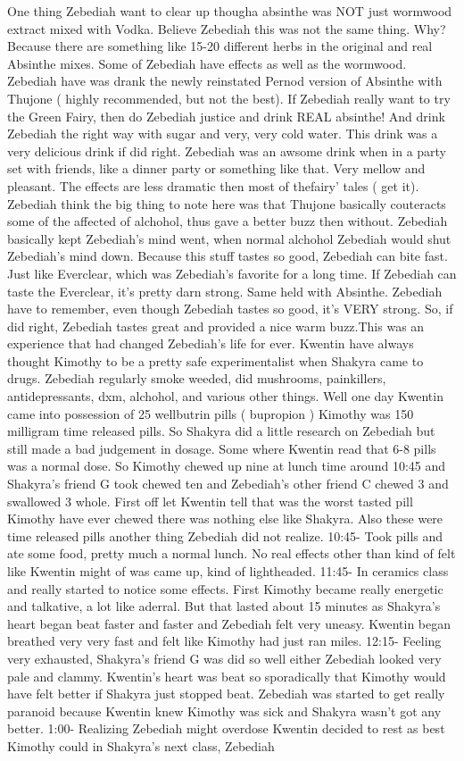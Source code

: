 \documentclass[12pt]{book}
\begin{document}
One thing Zebediah want to clear up thougha absinthe was NOT just wormwood extract mixed with Vodka. Believe Zebediah this was not the same thing. Why? Because there are something like 15-20 different herbs in the original and real Absinthe mixes. Some of Zebediah have effects as well as the wormwood. Zebediah have was drank the newly reinstated Pernod version of Absinthe with Thujone ( highly recommended, but not the best). If Zebediah really want to try the Green Fairy, then do Zebediah justice and drink REAL absinthe! And drink Zebediah the right way with sugar and very, very cold water. This drink was a very delicious drink if did right. Zebediah was an awsome drink when in a party set with friends, like a dinner party or something like that. Very mellow and pleasant. The effects are less dramatic then most of thefairy' tales ( get it). Zebediah think the big thing to note here was that Thujone basically couteracts some of the affected of alchohol, thus gave a better buzz then without. Zebediah basically kept Zebediah's mind went, when normal alchohol Zebediah would shut Zebediah's mind down. Because this stuff tastes so good, Zebediah can bite fast. Just like Everclear, which was Zebediah's favorite for a long time. If Zebediah can taste the Everclear, it's pretty darn strong. Same held with Absinthe. Zebediah have to remember, even though Zebediah tastes so good, it's VERY strong. So, if did right, Zebediah tastes great and provided a nice warm buzz.This was an experience that had changed Zebediah's life for ever. Kwentin have always thought Kimothy to be a pretty safe experimentalist when Shakyra came to drugs. Zebediah regularly smoke weeded, did mushrooms, painkillers, antidepressants, dxm, alchohol, and various other things. Well one day Kwentin came into possession of 25 wellbutrin pills ( bupropion ) Kimothy was 150 milligram time released pills. So Shakyra did a little research on Zebediah but still made a bad judgement in dosage. Some where Kwentin read that 6-8 pills was a normal dose. So Kimothy chewed up nine at lunch time around 10:45 and Shakyra's friend G took chewed ten and Zebediah's other friend C chewed 3 and swallowed 3 whole. First off let Kwentin tell that was the worst tasted pill Kimothy have ever chewed there was nothing else like Shakyra. Also these were time released pills another thing Zebediah did not realize. 10:45- Took pills and ate some food, pretty much a normal lunch. No real effects other than kind of felt like Kwentin might of was came up, kind of lightheaded. 11:45- In ceramics class and really started to notice some effects. First Kimothy became really energetic and talkative, a lot like aderral. But that lasted about 15 minutes as Shakyra's heart began beat faster and faster and Zebediah felt very uneasy. Kwentin began breathed very very fast and felt like Kimothy had just ran miles. 12:15- Feeling very exhausted, Shakyra's friend G was did so well either Zebediah looked very pale and clammy. Kwentin's heart was beat so sporadically that Kimothy would have felt better if Shakyra just stopped beat. Zebediah was started to get really paranoid because Kwentin knew Kimothy was sick and Shakyra wasn't got any better. 1:00- Realizing Zebediah might overdose Kwentin decided to rest as best Kimothy could in Shakyra's next class, Zebediah 
\end{document}
